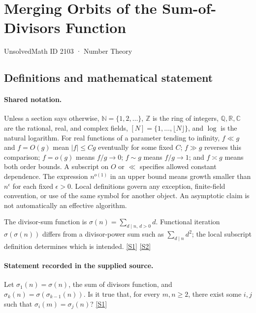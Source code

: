 \documentclass[11pt,a4paper]{article}
\newcommand{\N}{\mathbb{N}}
\newcommand{\Z}{\mathbb{Z}}
\newcommand{\Q}{\mathbb{Q}}
\newcommand{\R}{\mathbb{R}}
\newcommand{\C}{\mathbb{C}}
\newcommand{\sref}[2]{\hyperlink{source:#1:#2}{[S#2]}}
\begin{document}

\setcounter{section}{2102}

\section{Merging Orbits of the Sum-of-Divisors Function}\label{2103}

{\small\sffamily UnsolvedMath ID 2103 · Number Theory}

\subsection{Definitions and mathematical statement}

\paragraph{Shared notation.}Unless a section says otherwise, $\N=\{1,2,\ldots\}$,
$\Z$ is the ring of integers, $\Q,\R,\C$ are the rational, real, and complex
fields, $[N]=\{1,\ldots,\lfloor N\rfloor\}$, and $\log$ is the natural
logarithm. For real functions of a parameter tending to infinity,
$f\ll g$ and $f=O(g)$ mean $|f|\leq Cg$ eventually for some fixed $C$;
$f\gg g$ reverses this comparison; $f=o(g)$ means $f/g\to0$;
$f\sim g$ means $f/g\to1$; and $f\asymp g$ means both order bounds.
A subscript on $O$ or $\ll$ specifies allowed constant dependence.
The expression $n^{o(1)}$ in an upper bound means growth smaller than
$n^\epsilon$ for each fixed $\epsilon>0$. Local definitions govern any
exception, finite-field convention, or use of the same symbol for another
object. An asymptotic claim is not automatically an effective algorithm.



The divisor-sum function is $\sigma(n)=\sum_{d\mid n,\,d>0}d$. Functional iteration $\sigma(\sigma(n))$ differs from a divisor-power sum such as $\sum_{d\mid n}d^2$; the local subscript definition determines which is intended. \sref{2103}{1} \sref{2103}{2}

\paragraph{Statement recorded in the supplied source.}
Let $\sigma_1(n)=\sigma(n)$, the sum of divisors function, and $\sigma_k(n)=\sigma(\sigma_{k-1}(n))$.
Is it true that, for every $m,n\geq 2$, there exist some $i,j$ such that $\sigma_i(m)=\sigma_j(n)$? \sref{2103}{1}
\end{document}
